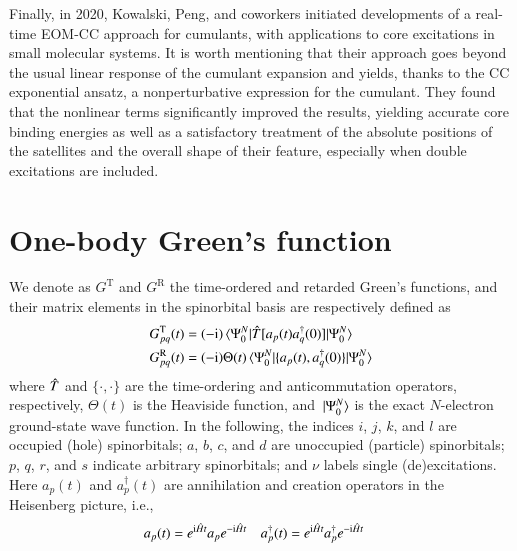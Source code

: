 \documentclass[aip,jcp,reprint,noshowkeys,superscriptaddress]{revtex4-2}
\newcommand{\hH}{\Hat{H}}
\newcommand{\hT}{\Hat{T}}
\newcommand{\ii}{\mathrm{i}}
\begin{document}
Finally, in 2020, Kowalski, Peng, and coworkers initiated developments of a real-time EOM-CC approach for cumulants, \cite{Rehr_2020,Vila_2020,Vila_2021,Vila_2022a,Vila_2022b,Pathak_2023} with applications to core excitations in small molecular systems. It is worth mentioning that their approach goes beyond the usual linear response of the cumulant expansion and yields, thanks to the CC exponential ansatz, a nonperturbative expression for the cumulant. They found that the nonlinear terms significantly improved the results, yielding accurate core binding energies as well as a satisfactory treatment of the absolute positions of the satellites and the overall shape of their feature, especially when double excitations are included.

\section{One-body Green's function}
\label{sec:G}

We denote as $G^\text{T}$ and $G^\text{R}$ the time-ordered and retarded Green's functions, \cite{Zhou_2018} and their matrix elements in the spinorbital basis are respectively defined as
\begin{subequations}
\begin{align}
	G_{pq}^\text{T}(t) & = (-\ii) \mel*{\Psi_0^N}{ \hT[a_p(t) a_q^\dag(0)] }{\Psi_0^N}
	\\
	G_{pq}^\text{R}(t) & = (-\ii) \Theta(t) \mel*{\Psi_0^N}{ \{ a_p(t),a_q^\dag(0) \} }{\Psi_0^N}
\end{align}
\end{subequations}
where $\hT$ and $\{ \cdot,\cdot \}$  are the time-ordering and anticommutation operators, respectively,
$\Theta(t)$ is the Heaviside function, and $\ket*{\Psi_0^N}$ is the exact $N$-electron ground-state wave function.
In the following, the indices $i$, $j$, $k$, and $l$ are occupied (hole) spinorbitals; $a$, $b$, $c$, and $d$ are unoccupied (particle) spinorbitals; $p$, $q$, $r$, and $s$ indicate arbitrary spinorbitals; and $\nu$ labels single (de)excitations.
Here $a_p(t)$ and $a_p^\dag(t)$ are annihilation and creation operators in the Heisenberg picture, i.e.,
\begin{align}
	a_{p}(t) & = e^{\ii \hH t} a_{p} e^{-\ii \hH t}
	&
	a_{p}^\dag(t) & = e^{\ii \hH t} a_{p}^\dag e^{-\ii \hH t}
\end{align}
\end{document}
